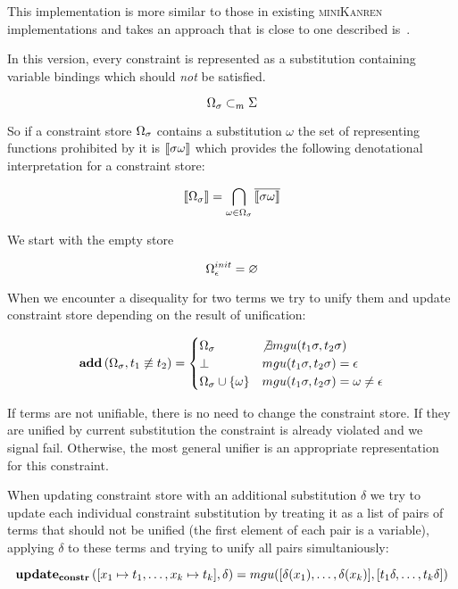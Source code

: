 This implementation is more similar to those in existing \textsc{miniKanren} implementations and takes an approach that is close to one described is~\cite{CKanren}.

In this version, every constraint is represented as a substitution containing variable bindings which should \emph{not} be satisfied.

\[ \Omega_\sigma \subset_m \Sigma \]

So if a constraint store $\Omega_\sigma$ contains a substitution $\omega$ the set of representing functions prohibited by it is $\llbracket{\sigma \omega}\rrbracket$
which provides the following denotational interpretation for a constraint store:

\[ \llbracket{\Omega_\sigma}\rrbracket = \bigcap_{\omega \in \Omega_\sigma} \overline{ \llbracket{\sigma \omega}\rrbracket } \]

We start with the empty store

\[ \Omega_\epsilon^{init} = \varnothing \]

When we encounter a disequality for two terms we try to unify them and update constraint store depending on the result of unification:

\[
\mathbf{add}\,(\Omega_\sigma, t_1 \not\equiv t_2) =
    \begin{cases}
       \Omega_\sigma                                & \not\exists mgu(t_1 \sigma, t_2 \sigma) \\
       \bot                                                 & mgu(t_1 \sigma, t_2 \sigma) = \epsilon \\
       \Omega_\sigma \cup \{\omega\}      & mgu(t_1 \sigma, t_2 \sigma) = \omega \neq \epsilon
    \end{cases}
\]

If terms are not unifiable, there is no need to change the constraint store. If they are unified by current substitution the constraint is already violated and we signal fail.
Otherwise, the most general unifier is an appropriate representation for this constraint.

When updating constraint store with an additional substitution $\delta$ we try to update each individual constraint substitution by treating it
as a list of pairs of terms that should not be unified (the first element of each pair is a variable), applying $\delta$ to these terms and trying to
unify all pairs simultaniously:

\[ \mathbf{update_{constr}}\,([x_1 \mapsto t_1, \dots, x_k \mapsto t_k], \delta) = mgu([\delta(x_1), \dots, \delta(x_k)],[t_1 \delta, \dots, t_k \delta]) \]


